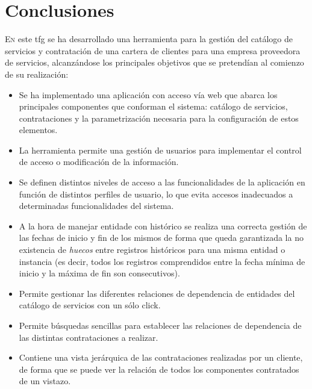 \chapter{Conclusiones}
\label{chap:conclusiones}

\lettrine{E}{n} este \acrshort{tfg} se ha desarrollado una herramienta para la gestión del catálogo de servicios y contratación de una cartera de clientes para una empresa proveedora de servicios, alcanzándose los principales objetivos que se pretendían al comienzo de su realización:
\begin{itemize}
\item Se ha implementado una aplicación con acceso vía web que abarca los principales componentes que conforman el sistema: catálogo de servicios, contrataciones y la parametrización necesaria para la configuración de estos elementos.

\item La herramienta permite una gestión de usuarios para implementar el control de acceso o modificación de la información.

\item Se definen distintos niveles de acceso a las funcionalidades de la aplicación en función de distintos perfiles de usuario, lo que evita accesos inadecuados a determinadas funcionalidades del sistema.

\item A la hora de manejar entidade con histórico se realiza una correcta gestión de las fechas de inicio y fin de los mismos de forma que queda garantizada la no existencia de \textit{huecos} entre registros históricos para una misma entidad o instancia (es decir, todos los registros comprendidos entre la fecha mínima de inicio y la máxima de fin son consecutivos).

\item Permite gestionar las diferentes relaciones de dependencia de entidades del catálogo de servicios con un sólo click.

\item Permite búsquedas sencillas para establecer las relaciones de dependencia de las distintas contrataciones a realizar.

\item Contiene una vista jerárquica de las contrataciones realizadas por un cliente, de forma que se puede ver la relación de todos los componentes contratados de un vistazo.

\end{itemize}


